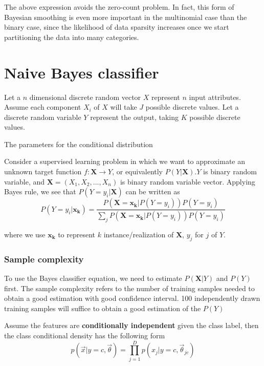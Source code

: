 \begin{refsection}
The above expression avoids the zero-count problem. In fact, this form of Bayesian smoothing is even more important in the multinomial case than the binary case, since the likelihood of data sparsity increases once we start partitioning the data into many categories.



\section{Naive Bayes classifier}



Let a $n$ dimensional discrete random vector $X$ represent $n$ input attributes. Assume each component $X_i$ of $X$ will take $J$ possible discrete values. Let a discrete random variable $Y$ represent the output, taking $K$ possible discrete values. 

The parameters for the conditional distribution



Consider a supervised learning problem in which we want to approximate an unknown target function $f:\bm{X}\rightarrow Y$, or equivalently $P(Y|\bm{X})$.$Y$ is binary random variable, and $\bm{X}=(X_1,X_2,...,X_n)$ is binary random variable vector. Applying Bayes rule, we see that $P(Y=y_i|\bm{X})$ can be written as
\begin{equation}
 P(Y=y_i|\bm{x_k}) = \frac{P(\bm{X=x_k}|P(Y=y_i))P(Y=y_i)}{\sum_j P(\bm{X=x_k}|P(Y=y_i))P(Y=y_i)}   
\end{equation}

where we use $\bm{x_k}$ to represent $k$ instance/realization of $\bm{X}$, $y_j$ for $j$ of $Y$.

\subsubsection{Sample complexity}
To use the Bayes classifier equation, we need to estimate $P(\bm{X}|Y)$ and $P(Y)$ first. The sample complexity refers to the number of training samples needed to obtain a good estimation with good confidence interval. 100 independently drawn training samples will suffice to obtain a good estimation of the $P(Y)$

Assume the features are \textbf{conditionally independent} given the class label, then the class conditional density has the following form
\begin{equation}
p(\vec{x}|y=c,\vec{\theta})=\prod\limits_{j=1}^D p(x_j|y=c,\vec{\theta}_{jc})
\end{equation}


\end{refsection}
